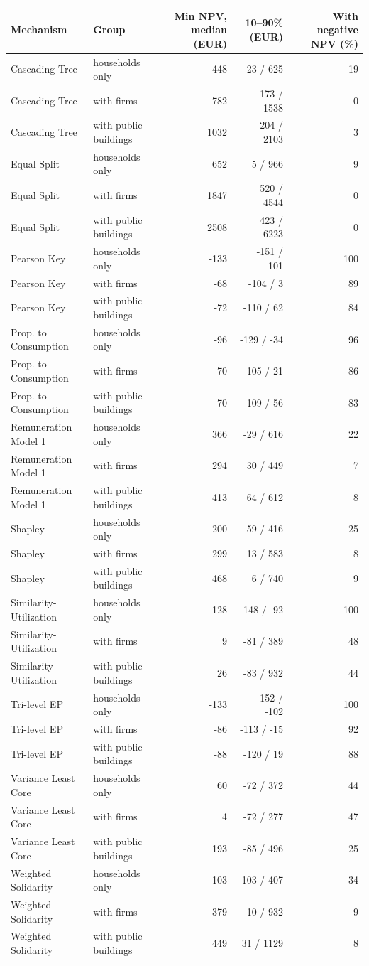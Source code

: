\begin{tabular}{llrrr}
\toprule
Mechanism & Group & Min NPV, median (EUR) & 10--90\% (EUR) & With negative NPV (\%) \\
\midrule
Cascading Tree & households only & 448 & -23 / 625 & 19 \\
Cascading Tree & with firms & 782 & 173 / 1538 & 0 \\
Cascading Tree & with public buildings & 1032 & 204 / 2103 & 3 \\
Equal Split & households only & 652 & 5 / 966 & 9 \\
Equal Split & with firms & 1847 & 520 / 4544 & 0 \\
Equal Split & with public buildings & 2508 & 423 / 6223 & 0 \\
Pearson Key & households only & -133 & -151 / -101 & 100 \\
Pearson Key & with firms & -68 & -104 / 3 & 89 \\
Pearson Key & with public buildings & -72 & -110 / 62 & 84 \\
Prop. to Consumption & households only & -96 & -129 / -34 & 96 \\
Prop. to Consumption & with firms & -70 & -105 / 21 & 86 \\
Prop. to Consumption & with public buildings & -70 & -109 / 56 & 83 \\
Remuneration Model 1 & households only & 366 & -29 / 616 & 22 \\
Remuneration Model 1 & with firms & 294 & 30 / 449 & 7 \\
Remuneration Model 1 & with public buildings & 413 & 64 / 612 & 8 \\
Shapley & households only & 200 & -59 / 416 & 25 \\
Shapley & with firms & 299 & 13 / 583 & 8 \\
Shapley & with public buildings & 468 & 6 / 740 & 9 \\
Similarity-Utilization & households only & -128 & -148 / -92 & 100 \\
Similarity-Utilization & with firms & 9 & -81 / 389 & 48 \\
Similarity-Utilization & with public buildings & 26 & -83 / 932 & 44 \\
Tri-level EP & households only & -133 & -152 / -102 & 100 \\
Tri-level EP & with firms & -86 & -113 / -15 & 92 \\
Tri-level EP & with public buildings & -88 & -120 / 19 & 88 \\
Variance Least Core & households only & 60 & -72 / 372 & 44 \\
Variance Least Core & with firms & 4 & -72 / 277 & 47 \\
Variance Least Core & with public buildings & 193 & -85 / 496 & 25 \\
Weighted Solidarity & households only & 103 & -103 / 407 & 34 \\
Weighted Solidarity & with firms & 379 & 10 / 932 & 9 \\
Weighted Solidarity & with public buildings & 449 & 31 / 1129 & 8 \\
\bottomrule
\end{tabular}
